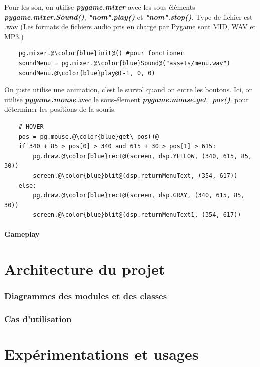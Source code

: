 \documentclass[a4paper]{report}
\begin{document}
Pour les son, on utilise \textbf{\textit{pygame.mixer}} avec les sous-éléments \textbf{\textit{pygame.mixer.Sound()}}, \textbf{\textit{"nom".play()}} et \textbf{\textit{"nom".stop()}}.
Type de fichier est .wav (Les formats de fichiers audio pris en charge par Pygame sont MID, WAV et MP3.)
\begin{lstlisting}
    pg.mixer.@\color{blue}init@() #pour fonctioner
    soundMenu = pg.mixer.@\color{blue}Sound@("assets/menu.wav")
    soundMenu.@\color{blue}play@(-1, 0, 0)
\end{lstlisting}

On juste utilise une animation, c'est le survol quand on entre les boutons.
Ici, on utilise \textbf{\textit{pygame.mouse}} avec le sous-élement \textbf{\textit{pygame.mouse.get\_pos()}}.
pour déterminer les positions de la souris.
\begin{lstlisting}
    # HOVER
    pos = pg.mouse.@\color{blue}get\_pos()@
    if 340 + 85 > pos[0] > 340 and 615 + 30 > pos[1] > 615:
        pg.draw.@\color{blue}rect@(screen, dsp.YELLOW, (340, 615, 85, 30))
        screen.@\color{blue}blit@(dsp.returnMenuText, (354, 617))
    else:
        pg.draw.@\color{blue}rect@(screen, dsp.GRAY, (340, 615, 85, 30))
        screen.@\color{blue}blit@(dsp.returnMenuText1, (354, 617))
\end{lstlisting}

\subsection{Gameplay}


\part{Architecture du projet}
\section{Diagrammes des modules et des classes}
\section{Cas d'utilisation}

\part{Expérimentations et usages}
\end{document}
